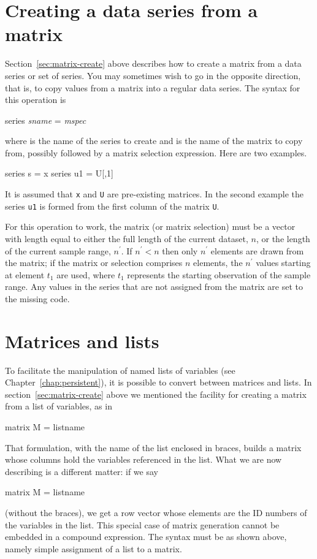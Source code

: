 \section{Creating a data series from a matrix}
\label{matrix-create-series}

Section~\ref{sec:matrix-create} above describes how to create a matrix
from a data series or set of series.  You may sometimes wish to go in
the opposite direction, that is, to copy values from a matrix 
into a regular data series.  The syntax for this operation is
%
\begin{textcode}
series \textsl{sname} = \textsl{mspec}
\end{textcode}
%
where  is the name of the series to create and
 is the name of the matrix to copy from, possibly followed
by a matrix selection expression.  Here are two examples.
%
\begin{code}
series s = x
series u1 = U[,1]
\end{code}
%
It is assumed that \texttt{x} and \texttt{U} are pre-existing
matrices.  In the second example the series \texttt{u1} is formed from
the first column of the matrix \texttt{U}.

For this operation to work, the matrix (or matrix selection) must be a
vector with length equal to either the full length of the current
dataset, $n$, or the length of the current sample range, $n^{\prime}$.
If $n^{\prime} < n$ then only $n^{\prime}$ elements are drawn from the
matrix; if the matrix or selection comprises $n$ elements, the
$n^{\prime}$ values starting at element $t_1$ are used, where $t_1$
represents the starting observation of the sample range.  Any values
in the series that are not assigned from the matrix are set to the
missing code.


\section{Matrices and lists}
\label{matrix-and-list}

To facilitate the manipulation of named lists of variables (see
Chapter~\ref{chap:persistent}), it is possible to convert between
matrices and lists.  In section~\ref{sec:matrix-create} above we mentioned
the facility for creating a matrix from a list of variables, as in
%
\begin{code}
matrix M = { listname }
\end{code}
%
That formulation, with the name of the list enclosed in braces, builds
a matrix whose columns hold the variables referenced in the list.
What we are now describing is a different matter: if we say
%
\begin{code}
matrix M = listname
\end{code}
%
(without the braces), we get a row vector whose elements are
the ID numbers of the variables in the list.  This special case
of matrix generation cannot be embedded in a compound
expression.  The syntax must be as shown above, namely simple
assignment of a list to a matrix.

